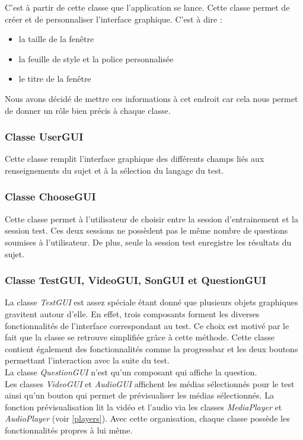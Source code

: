 C'est à partir de cette classe que l'application se lance.
Cette classe permet de créer et de personnaliser l'interface graphique. C'est à dire :
\begin{itemize}
 \item la taille de la fenêtre
 \item la feuille de style et la police personnalisée
 \item le titre de la fenêtre
\end{itemize}
Nous avons décidé de mettre ces informations à cet endroit car cela nous permet de donner un rôle bien précis à chaque classe.

\subsubsection{Classe UserGUI}

Cette classe remplit l'interface graphique des différents champs liés aux renseignements du sujet et à la sélection du langage du test. 

\subsubsection{Classe ChooseGUI}

Cette classe permet à l'utilisateur de choisir entre la session d'entrainement et la session test. Ces deux sessions ne possèdent pas le même nombre de questions soumises à l'utilisateur. De plus, seule la session test enregistre les résultats du sujet.

\subsubsection{Classe TestGUI, VideoGUI, SonGUI et QuestionGUI}

La classe \textit{TestGUI} est assez spéciale étant donné que plusieurs objets graphiques gravitent autour d'elle. En effet, trois composants forment les diverses fonctionnalités de l'interface correspondant au test. Ce choix est motivé par le fait que la classe se retrouve simplifiée grâce à cette méthode. Cette classe contient également des fonctionnalités comme la progressbar et les deux boutons permettant l'interaction avec la suite du test.\\
La classe \textit{QuestionGUI} n'est qu'un composant qui affiche la question.\\
Les classes \textit{VideoGUI} et \textit{AudioGUI} affichent les médias sélectionnés pour le test ainsi qu'un bouton qui permet de prévisualiser les médias sélectionnés. La fonction prévisualisation lit la vidéo et l'audio via les classes \textit{MediaPlayer} et \textit{AudioPlayer} (voir \ref{players}).
Avec cette organisation, chaque classe possède les fonctionnalités propres à lui même.

